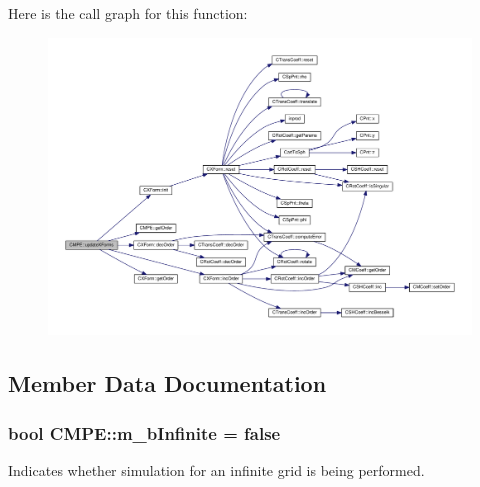 Here is the call graph for this function\-:
\nopagebreak
\begin{figure}[H]
\begin{center}
\leavevmode
\includegraphics[width=350pt]{classCMPE_a65d2f19a87b451dbd84bb4b11cbfd571_cgraph}
\end{center}
\end{figure}




\subsection{Member Data Documentation}
\hypertarget{classCMPE_a1c612f996b0be31759020f287d3ee7cc}{
\subsubsection[{m\-\_\-b\-Infinite}]{\setlength{\rightskip}{0pt plus 5cm}bool C\-M\-P\-E\-::m\-\_\-b\-Infinite = false\hspace{0.3cm}{\ttfamily [static]}}}\label{classCMPE_a1c612f996b0be31759020f287d3ee7cc}


Indicates whether simulation for an infinite grid is being performed. 

